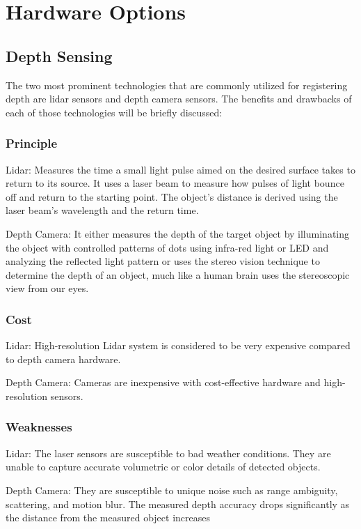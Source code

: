 \documentclass{article}
\begin{document}
\section{Hardware Options}

\subsection{Depth Sensing}

The two most prominent technologies that are commonly utilized for registering depth are lidar sensors and depth camera sensors. The benefits and drawbacks of each of those technologies will be briefly discussed:

\subsubsection{Principle}

Lidar: Measures the time a small light pulse aimed on the desired surface takes to return to its source. It uses a laser beam to measure how pulses of light bounce off and return to the starting point. The object’s distance is derived using the laser beam’s wavelength and the return time.

Depth Camera: It either measures the depth of the target object by illuminating the object with controlled patterns of dots using infra-red light or LED and analyzing the reflected light pattern or uses the stereo vision technique to determine the depth of an object, much like a human brain uses the stereoscopic view from our eyes.


\subsubsection{Cost}

Lidar: High-resolution Lidar system is considered to be very expensive compared to depth camera hardware.

Depth Camera: Cameras are inexpensive with cost-effective hardware and high-resolution sensors.

 
\subsubsection{Weaknesses}

Lidar: The laser sensors are susceptible to bad weather conditions. They are unable to capture accurate volumetric or color details of detected objects.

Depth Camera: They are susceptible to unique noise such as range ambiguity, scattering, and motion blur. The measured depth accuracy drops significantly as the distance from the measured object increases
\end{document}
